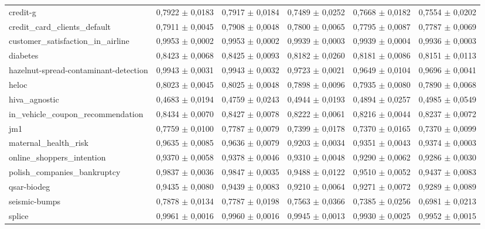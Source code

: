 \documentclass[11pt,a4paper]{article}
\begin{document}
\begin{table}[htbp]
{\begin{tabular}{@{}lrrrrr@{}}
        credit-g & 0,7922 $\pm$ 0,0183 & 0,7917 $\pm$ 0,0184 & 0,7489 $\pm$ 0,0252 & 0,7668 $\pm$ 0,0182 & 0,7554 $\pm$ 0,0202 \\
        credit\_card\_clients\_default & 0,7911 $\pm$ 0,0045 & 0,7908 $\pm$ 0,0048 & 0,7800 $\pm$ 0,0065 & 0,7795 $\pm$ 0,0087 & 0,7787 $\pm$ 0,0069 \\
        customer\_satisfaction\_in\_airline & 0,9953 $\pm$ 0,0002 & 0,9953 $\pm$ 0,0002 & 0,9939 $\pm$ 0,0003 & 0,9939 $\pm$ 0,0004 & 0,9936 $\pm$ 0,0003 \\
        diabetes & 0,8423 $\pm$ 0,0068 & 0,8425 $\pm$ 0,0093 & 0,8182 $\pm$ 0,0260 & 0,8181 $\pm$ 0,0086 & 0,8151 $\pm$ 0,0113 \\
        hazelnut-spread-contaminant-detection & 0,9943 $\pm$ 0,0031 & 0,9943 $\pm$ 0,0032 & 0,9723 $\pm$ 0,0021 & 0,9649 $\pm$ 0,0104 & 0,9696 $\pm$ 0,0041 \\
        heloc & 0,8023 $\pm$ 0,0045 & 0,8025 $\pm$ 0,0048 & 0,7898 $\pm$ 0,0096 & 0,7935 $\pm$ 0,0080 & 0,7890 $\pm$ 0,0068 \\
        hiva\_agnostic & 0,4683 $\pm$ 0,0194 & 0,4759 $\pm$ 0,0243 & 0,4944 $\pm$ 0,0193 & 0,4894 $\pm$ 0,0257 & 0,4985 $\pm$ 0,0549 \\
        in\_vehicle\_coupon\_recommendation & 0,8434 $\pm$ 0,0070 & 0,8427 $\pm$ 0,0078 & 0,8222 $\pm$ 0,0061 & 0,8216 $\pm$ 0,0044 & 0,8237 $\pm$ 0,0072 \\
        jm1 & 0,7759 $\pm$ 0,0100 & 0,7787 $\pm$ 0,0079 & 0,7399 $\pm$ 0,0178 & 0,7370 $\pm$ 0,0165 & 0,7370 $\pm$ 0,0099 \\
        maternal\_health\_risk & 0,9635 $\pm$ 0,0085 & 0,9636 $\pm$ 0,0079 & 0,9203 $\pm$ 0,0034 & 0,9351 $\pm$ 0,0043 & 0,9374 $\pm$ 0,0003 \\
        online\_shoppers\_intention & 0,9370 $\pm$ 0,0058 & 0,9378 $\pm$ 0,0046 & 0,9310 $\pm$ 0,0048 & 0,9290 $\pm$ 0,0062 & 0,9286 $\pm$ 0,0030 \\
        polish\_companies\_bankruptcy & 0,9837 $\pm$ 0,0036 & 0,9847 $\pm$ 0,0035 & 0,9488 $\pm$ 0,0122 & 0,9510 $\pm$ 0,0052 & 0,9437 $\pm$ 0,0083 \\
        qsar-biodeg & 0,9435 $\pm$ 0,0080 & 0,9439 $\pm$ 0,0083 & 0,9210 $\pm$ 0,0064 & 0,9271 $\pm$ 0,0072 & 0,9289 $\pm$ 0,0089 \\
        seismic-bumps & 0,7878 $\pm$ 0,0134 & 0,7787 $\pm$ 0,0198 & 0,7563 $\pm$ 0,0366 & 0,7385 $\pm$ 0,0256 & 0,6981 $\pm$ 0,0213 \\
        splice & 0,9961 $\pm$ 0,0016 & 0,9960 $\pm$ 0,0016 & 0,9945 $\pm$ 0,0013 & 0,9930 $\pm$ 0,0025 & 0,9952 $\pm$ 0,0015 \\

\end{tabular}}
\end{table}
\end{document}
